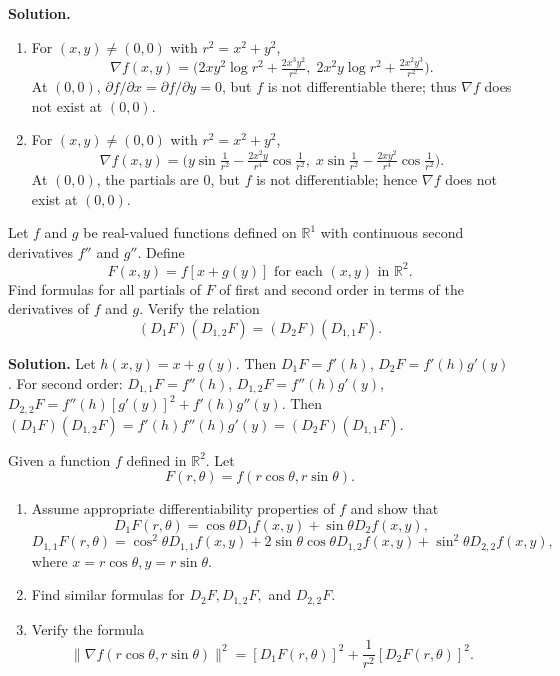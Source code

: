 \noindent\textbf{Solution.}
\begin{enumerate}[label=(\alph*)]
\item For $(x,y)\ne(0,0)$ with $r^2=x^2+y^2$,
\[\nabla f(x,y)=\big(2xy^2\log r^2+\tfrac{2x^3y^2}{r^2},\;2x^2y\log r^2+\tfrac{2x^2y^3}{r^2}\big).\]
At $(0,0)$, $\partial f/\partial x=\partial f/\partial y=0$, but $f$ is not differentiable there; thus $\nabla f$ does not exist at $(0,0)$.
\item For $(x,y)\ne(0,0)$ with $r^2=x^2+y^2$,
\[\nabla f(x,y)=\big(y\sin\tfrac{1}{r^2}-\tfrac{2x^2y}{r^4}\cos\tfrac{1}{r^2},\;x\sin\tfrac{1}{r^2}-\tfrac{2xy^2}{r^4}\cos\tfrac{1}{r^2}\big).\]
At $(0,0)$, the partials are $0$, but $f$ is not differentiable; hence $\nabla f$ does not exist at $(0,0)$.
\end{enumerate}

\begin{problembox}
Let \( f \) and \( g \) be real-valued functions defined on \( \mathbb{R}^1 \) with continuous second derivatives \( f'' \) and \( g'' \). Define
\[F(x, y) = f[x + g(y)] \text{ for each } (x, y) \text{ in } \mathbb{R}^2.\]
Find formulas for all partials of \( F \) of first and second order in terms of the derivatives of \( f \) and \( g \). Verify the relation
\[(D_1F)(D_{1,2}F) = (D_2F)(D_{1,1}F).\]
\end{problembox}

\noindent\textbf{Solution.}
Let $h(x,y)=x+g(y)$. Then $D_1F=f'(h)$, $D_2F=f'(h)g'(y)$. For second order: $D_{1,1}F=f''(h)$, $D_{1,2}F=f''(h)g'(y)$, $D_{2,2}F=f''(h)[g'(y)]^2+f'(h)g''(y)$. Then $(D_1F)(D_{1,2}F)=f'(h)f''(h)g'(y)=(D_2F)(D_{1,1}F)$.

\begin{problembox}
Given a function \( f \) defined in \( \mathbb{R}^2 \). Let
\[F(r, \theta) = f(r \cos \theta, r \sin \theta).\]
\begin{enumerate}[label=(\alph*)]
\item Assume appropriate differentiability properties of \( f \) and show that
\[D_1F(r, \theta) = \cos \theta D_1f(x, y) + \sin \theta D_2f(x, y),\]
\[D_{1,1}F(r, \theta) = \cos^2 \theta D_{1,1}f(x, y) + 2 \sin \theta \cos \theta D_{1,2}f(x, y) + \sin^2 \theta D_{2,2}f(x, y),\]
where \( x = r \cos \theta, y = r \sin \theta \).
\item Find similar formulas for \( D_2F, D_{1,2}F, \) and \( D_{2,2}F \).
\item Verify the formula
\[\| \nabla f(r \cos \theta, r \sin \theta) \|^2 = [D_1F(r, \theta)]^2 + \frac{1}{r^2} [D_2F(r, \theta)]^2.\]
\end{enumerate}
\end{problembox}

